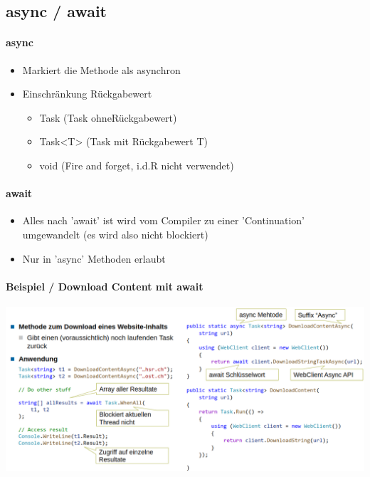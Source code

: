 \documentclass[
a4paper,
oneside,
10pt,
fleqn,
headsepline,
toc=listofnumbered, 
bibliography=totocnumbered]{scrartcl}
\begin{document}
\subsection{async / await}
\paragraph{async}
\begin{itemize}
	\item Markiert die Methode als asynchron
	\item Einschränkung Rückgabewert
	      \begin{itemize}
		      \item Task (Task ohneRückgabewert)
		      \item Task<T> (Task mit Rückgabewert T)
		      \item void (Fire and forget, i.d.R nicht verwendet)
	      \end{itemize}
\end{itemize}
\paragraph{await}
\begin{itemize}
	\item Alles nach 'await' ist wird vom Compiler zu einer 'Continuation' umgewandelt (es wird also nicht blockiert)
	\item Nur in 'async' Methoden erlaubt
\end{itemize}
\clearpage
\paragraph{Beispiel / Download Content mit await} \hfill
\newline


\begin{minipage}[t]{0.95\textwidth}
	\centering
	\includegraphics[width=0.95\linewidth]{images/beispiel-async-await.png}
\end{minipage}
\end{document}
